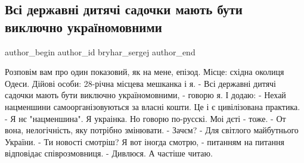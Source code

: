  
 
 
 
 
 
\subsection{Всі державні дитячі садочки мають бути виключно україномовними}
\label{sec:24_11_2021.fb.bryhar_sergej.1.detsad_mova}
 
\ifcmt
 author_begin
   author_id bryhar_sergej
 author_end
\fi

\obeycr
Розповім вам про один показовий, як на мене, епізод.
Місце: східна околиця Одеси.
Дійові особи: 28-річна місцева мешканка і я.
- Всі державні дитячі садочки мають бути виключно україномовними, - говорю я. І додаю: - Нехай нацменшини самоорганізовуються за власні кошти. Це і є цивілізована практика.
- Я нє "нацменшина". Я украінка. Но говорю по-русскі. Моі дєті - тоже.
- От вона, нелогічність, яку потрібно змінювати.
- Зачєм?
- Для світлого майбутнього України.
- Ти новості смотріш? Я вот іногда смотрю, - питанням на питання відповідає співрозмовниця.
- Дивлюся. А частіше читаю.
\restorecr


